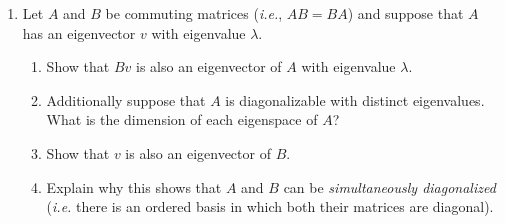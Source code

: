 \begin{enumerate}
\begin{itemize}
{\it Note:} It turns out that every matrix is similar to a block matrix whose diagonal blocks look like diagonal matrices or the ones above and whose off-diagonal blocks are all zero. This is called the {\it Jordan form} of the matrix and a (maximal) block that looks like
\[
\left(
\begin{array}{ccccc}
\lambda & 1 & 0&\cdots & 0 \\
0 & \lambda & 1 & & 0 \\
\vdots &  &\ddots &\ddots &  \\
&&&\lambda&1\\
0 &0 &&  0 & \lambda
\end{array}\right)
\]
is called a \emph{Jordan $n$-cell} or a \emph{Jordan block} where $n$ is the size of the block.
\end{itemize}


\item Let $A$ and $B$ be commuting matrices ({\it i.e.}, $AB = BA$) and suppose that $A$ has an eigenvector $v$ with eigenvalue $\lambda$. 
\begin{enumerate}
\item Show that $Bv$ is also  an eigenvector of $A$ with eigenvalue $\lambda$. 
\item Additionally suppose that $A$ is diagonalizable with distinct eigenvalues. What is the dimension of each eigenspace of $A$?
\item Show that $v$ is also an eigenvector of $B$. 
\item Explain why this shows that $A$ and $B$ can be \emph{simultaneously diagonalized} ({\it i.e.}
there is an ordered basis in which  both their matrices are diagonal).
\end{enumerate}






\end{enumerate}


